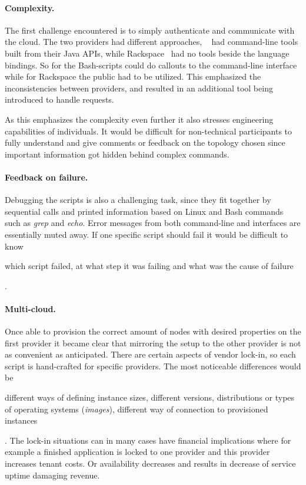 \paragraph{Complexity.} 

The first challenge encountered is to simply 
authenticate and communicate with the cloud. 
The two providers had different approaches, ~\cite{aws} 
had command-line tools built from their Java APIs,
while Rackspace~\cite{rackspace} had no tools beside the  language bindings.
So for  the Bash-scripts could do callouts to the command-line interface 
while for Rackspace the public   had to be utilized.
This emphasized the inconsistencies between providers, 
and resulted in an additional tool being introduced to handle requests.

As this emphasizes the complexity even further it also stresses engineering 
capabilities of individuals.
It would be difficult for non-technical participants to fully understand and give comments
or feedback on the topology chosen since important information got hidden behind
complex commands.

\paragraph{Feedback on failure.}
Debugging the scripts is also a challenging task, since they fit together by
sequential calls and printed information based on Linux and Bash commands such as 
\emph{grep} and \emph{echo}.
Error messages from both command-line and  interfaces are essentially muted away.
If one specific script should fail it would be difficult to know 
\begin{ii}
  \iitem which script failed, 
  \iitem at what step it was failing and 
  \iitem what was the cause of failure
\end{ii}.

\paragraph{Multi-cloud.}

Once able to provision the correct amount of nodes with desired properties
on the first provider it became clear that mirroring the setup to the other provider 
is not as convenient as anticipated.
There are certain aspects of vendor lock-in, so each script is hand-crafted for specific providers.
The most noticeable differences would be
\begin{ii}
  \iitem different ways of defining instance sizes,
  \iitem different versions, distributions or types of operating systems (\emph{images}),
  \iitem different way of connection to provisioned instances
\end{ii}.
The lock-in situations can in many cases have financial implications where for example
a finished application is locked to one provider and this provider increases tenant costs.
Or availability decreases and results in decrease of service uptime damaging revenue.

